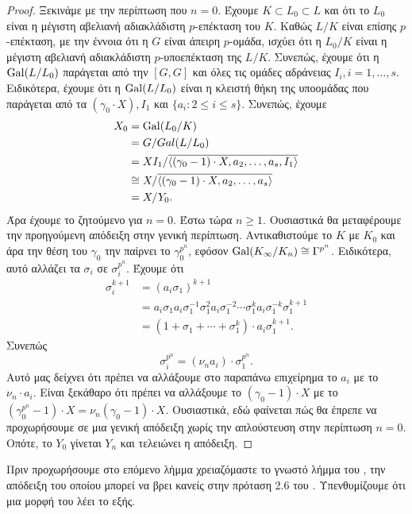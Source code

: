 \begin{proof} Ξεκινάμε με την περίπτωση που $n=0$. Έχουμε $K\subset L_0 \subset L$ και ότι το $L_0$ είναι η μέγιστη αβελιανή αδιακλάδιστη $p$-επέκταση του $K$. Καθώς $L/K$ είναι επίσης $p$-επέκταση, με την έννοια ότι η $G$ είναι άπειρη $p$-ομάδα, ισχύει ότι η $L_0/K$ είναι η μέγιστη αβελιανή αδιακλάδιστη $p$-υποεπέκταση της $L/K$. Συνεπώς, έχουμε ότι η $\operatorname{Gal}(L/L_0)$ παράγεται από την $[G,G]$ και όλες τις ομάδες αδράνειας $I_i, i=1,\ldots, s$. Ειδικότερα, έχουμε ότι η $\operatorname{Gal}(L/L_0)$ είναι η κλειστή θήκη της υποομάδας που παράγεται από τα $(\gamma_0 \cdot X), I_1$ και $\{a_i: 2\leq i \leq s\}$. Συνεπώς, έχουμε
    \begin{align*}
        X_0 &= \operatorname{Gal}(L_0/K) \\
        &= G/Gal(L/L_0) \\
        &= XI_1 / \overline{\langle (\gamma_0-1)\cdot X, a_2,\ldots,a_s,I_1\rangle}\\
        &\cong X/\overline{\langle (\gamma_0-1)\cdot X,a_2,\ldots,a_s\rangle} \\
        &= X/Y_0 .
    \end{align*} Άρα έχουμε το ζητούμενο για $n=0$. Έστω τώρα $n\geq 1$. Ουσιαστικά θα μεταφέρουμε την προηγούμενη απόδειξη στην γενική περίπτωση. Αντικαθιστούμε το $K$ με $K_0$ και άρα την θέση του $\gamma_0$ την παίρνει το 
    $\gamma_0^{p^n}$, εφόσον $\operatorname{Gal}(K_\infty/K_n)\cong \Gamma^{p^n}$. Ειδικότερα, αυτό αλλάζει τα $\sigma_i$ σε $\sigma_i^{p^n}$. Έχουμε ότι
    \begin{align*}
        \sigma_i^{k+1} & = (a_i \sigma_1)^{k+1} \\
        &= a_i \sigma_1 a_i \sigma_1^{-1} \sigma_1^2a_i\sigma_1^{-2} \cdots \sigma_1^k a_i \sigma_1^{-k} \sigma_1^{k+1} \\ 
        &= (1+\sigma_1 + \cdots + \sigma_1^k) \cdot a_i \sigma_1^{k+1}.
    \end{align*} Συνεπώς
    $$\sigma_i^{p^n} = (\nu_n a_i) \cdot \sigma_1^{p^n}.$$ Αυτό μας δείχνει ότι πρέπει να αλλάξουμε στο παραπάνω επιχείρημα το $a_i $ με το $\nu_n \cdot a_i$. Είναι ξεκάθαρο ότι πρέπει να αλλάξουμε το $(\gamma_0-1)\cdot X$ με το $(\gamma_0^{p^n}-1)\cdot X = \nu_n(\gamma_0-1)\cdot X$. Ουσιαστικά, εδώ φαίνεται πώς θα έπρεπε να προχωρήσουμε σε μια γενική απόδειξη χωρίς την απλούστευση στην περίπτωση $n=0$. Οπότε, το $Y_0$ γίνεται $Y_n$ και τελειώνει η απόδειξη.
\end{proof}

\noindent Πριν προχωρήσουμε στο επόμενο λήμμα χρειαζόμαστε το γνωστό λήμμα του , την απόδειξη του οποίου μπορεί να βρει κανείς στην πρόταση 2.6 του \cite{AM}. Υπενθυμίζουμε ότι μια μορφή του λέει το εξής.

